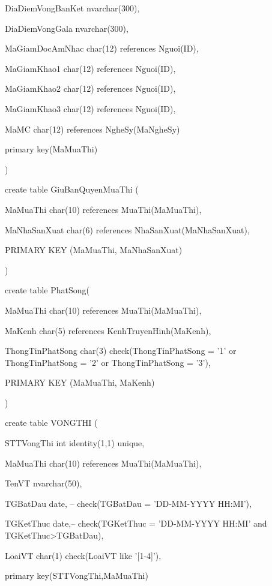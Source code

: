 \documentclass{report}
\begin{document}
	DiaDiemVongBanKet nvarchar(300),
	
	DiaDiemVongGala nvarchar(300),
	
	MaGiamDocAmNhac char(12) references Nguoi(ID),
	
	MaGiamKhao1 char(12) references Nguoi(ID),
	
	MaGiamKhao2 char(12) references Nguoi(ID),
	
	MaGiamKhao3 char(12) references Nguoi(ID),
	
	MaMC char(12) references NgheSy(MaNgheSy)
	
	primary key(MaMuaThi)
	
	\setlength{\parindent}{0.5cm}
)

\bigskip

create table GiuBanQuyenMuaThi (

	\setlength{\parindent}{1.5cm}
	MaMuaThi char(10) references MuaThi(MaMuaThi),
	
	MaNhaSanXuat char(6) references NhaSanXuat(MaNhaSanXuat),
	
	PRIMARY KEY (MaMuaThi, MaNhaSanXuat)
	
	\setlength{\parindent}{0.5cm}
)

\bigskip

create table PhatSong(

	\setlength{\parindent}{1.5cm}
	MaMuaThi char(10) references MuaThi(MaMuaThi),
	
	MaKenh char(5) references KenhTruyenHinh(MaKenh),
	
	ThongTinPhatSong char(3) check(ThongTinPhatSong = '1' or ThongTinPhatSong = '2'  or ThongTinPhatSong = '3'),
	
	PRIMARY KEY (MaMuaThi, MaKenh)
	
	\setlength{\parindent}{0.5cm}
)

\bigskip

create table VONGTHI (

	\setlength{\parindent}{1.5cm}
	STTVongThi int identity(1,1) unique,
	
	MaMuaThi char(10) references MuaThi(MaMuaThi),
	
	TenVT nvarchar(50),
	
	TGBatDau date, -- check(TGBatDau = 'DD-MM-YYYY HH:MI'),
	
	TGKetThuc date,-- check(TGKetThuc = 'DD-MM-YYYY HH:MI' and TGKetThuc>TGBatDau),
	
	LoaiVT char(1) check(LoaiVT like '[1-4]'),
	
	primary key(STTVongThi,MaMuaThi)
	
\end{document}
